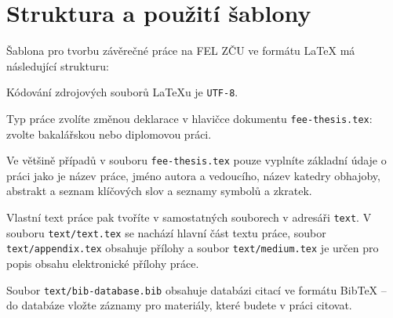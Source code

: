 \chapter{Struktura a použití šablony}\label{chap:struct}

Šablona pro tvorbu závěrečné práce na FEL ZČU ve formátu \LaTeX{} má následující strukturu:


\bigskip

\begin{note}
  Kódování zdrojových souborů \LaTeX{}u je \texttt{UTF-8}.
\end{note}

\begin{note}
Typ práce zvolíte změnou deklarace v hlavičce dokumentu \texttt{fee-thesis.tex}: zvolte bakalářskou nebo diplomovou práci.
\end{note}

\bigskip

Ve většině případů v souboru \texttt{fee-thesis.tex} pouze vyplníte základní údaje o práci jako je název práce, jméno autora a vedoucího, název katedry obhajoby, abstrakt a seznam klíčových slov a seznamy symbolů a zkratek.

Vlastní text práce pak tvoříte v samostatných souborech v adresáři \texttt{text}. V souboru \texttt{text/text.tex} se nachází hlavní část textu práce, soubor \texttt{text/appendix.tex} obsahuje přílohy a soubor \texttt{text/medium.tex} je určen pro popis obsahu elektronické přílohy práce.

Soubor \texttt{text/bib-database.bib} obsahuje databázi citací ve formátu BibTeX -- do databáze vložte záznamy pro materiály, které budete v práci citovat.

